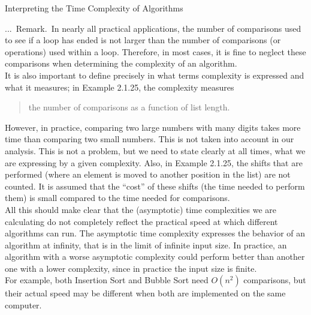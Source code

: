 \documentclass[smaller,hyperref={CJKbookmarks=true}]{beamer}
\newcounter{zhuo}[subsection]
\renewcommand{\thezhuo}{\thesection.\thesubsection.\arabic{zhuo}}
\newenvironment{REMARK}{\stepcounter{zhuo}\alert{\thezhuo.~Remark.\,}}{}
\begin{document}
\begin{frame}{Interpreting the Time Complexity of Algorithms}
\begin{spacing}{1.05}
\begin{REMARK}
In nearly all practical applications, the number of
comparisons used to see if a loop has ended is not larger than the number
of comparisons (or operations) used within a loop. Therefore, in most
cases, it is fine to neglect these comparisons when determining the
complexity of an algorithm.\\[5pt]
It is also important to define precisely in what terms complexity is
expressed and what it measures; in Example 2.1.25, the complexity
measures
\begin{quote}
  the number of comparisons as a function of list length.
\end{quote}
However, in practice, comparing two large numbers with many digits takes
more time than comparing two small numbers. This is not taken into
account in our analysis. This is not a problem, but we need to state clearly
at all times, what we are expressing by a given complexity.
\newpage
Also, in Example 2.1.25, the shifts that are performed (where an element
is moved to another position in the list) are not counted. It is assumed
that the ``cost'' of these shifts (the time needed to perform them) is small
compared to the time needed for comparisons.\\[5pt]
All this should make clear that the (asymptotic) time complexities we are
calculating do not completely reflect the practical speed at which different
algorithms can run. The asymptotic time complexity expresses the
behavior of an algorithm at infinity, that is in the limit of infinite input
size. In practice, an algorithm with a worse asymptotic complexity could
perform better than another one with a lower complexity, since in practice
the input size is finite.\\[5pt]
For example, both Insertion Sort and Bubble Sort need $O(n^2)$
comparisons, but their actual speed may be different when both are
implemented on the same computer.
\end{REMARK}
\end{spacing}
\end{frame}
\end{document}

